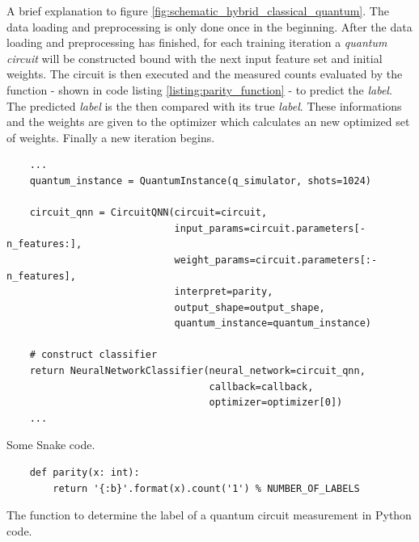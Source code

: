 A brief explanation to figure \ref{fig:schematic_hybrid_classical_quantum}. The data loading and preprocessing is only done once in the beginning. After the data loading and preprocessing has finished, for each training iteration a \textit{quantum circuit} will be constructed bound with the next input feature set and initial weights. The circuit is then executed and the measured counts evaluated by the  function - shown in code listing \ref{listing:parity_function} - to predict the \textit{label}. The predicted \textit{label} is the then compared with its true \textit{label}. These informations and the weights are given to the optimizer which calculates an new optimized set of weights. Finally a new iteration begins.


\begin{listing}[!ht]
    \begin{verbatim}
    ...
    quantum_instance = QuantumInstance(q_simulator, shots=1024)

    circuit_qnn = CircuitQNN(circuit=circuit,
                             input_params=circuit.parameters[-n_features:],
                             weight_params=circuit.parameters[:-n_features],
                             interpret=parity,
                             output_shape=output_shape,
                             quantum_instance=quantum_instance)

    # construct classifier
    return NeuralNetworkClassifier(neural_network=circuit_qnn,
                                   callback=callback,
                                   optimizer=optimizer[0])
    ...
    \end{verbatim}
    \caption{Some Snake code.}
    \label{listing:qnn_network_classifier_python}
\end{listing}


\begin{listing}[!ht]
    \begin{verbatim}
    def parity(x: int):
        return '{:b}'.format(x).count('1') % NUMBER_OF_LABELS
    \end{verbatim}
    \caption{The  function to determine the label of a quantum circuit measurement in Python code.}
    \label{listing:parity_function}
\end{listing}

